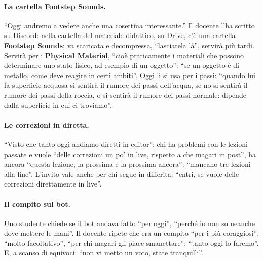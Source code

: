 \paragraph{La cartella Footstep Sounds.} ``Oggi andremo a vedere anche una cosettina
interessante.'' Il docente l'ha scritto su Discord: nella cartella del materiale
didattico, su Drive, c'è una cartella \textbf{Footstep Sounds}; va scaricata e
decompressa, ``lasciatela là'', servirà più tardi. Servirà per i \textbf{Physical
Material}, ``cioè praticamente i materiali che possono determinare uno stato fisico, ad
esempio di un oggetto'': ``se un oggetto è di metallo, come deve reagire in certi
ambiti''. Oggi li si usa per i passi: ``quando lui fa superficie acquosa si sentirà il
rumore dei passi dell'acqua, se no si sentirà il rumore dei passi della roccia, o si
sentirà il rumore dei passi normale: dipende dalla superficie in cui ci troviamo''.

\paragraph{Le correzioni in diretta.} ``Visto che tanto oggi andiamo diretti in
editor'': chi ha problemi con le lezioni passate e vuole ``delle correzioni un po' in
live, rispetto a che magari in post'', ha ancora ``questa lezione, la prossima e la
prossima ancora'': ``mancano tre lezioni alla fine''. L'invito vale anche per chi segue in
differita: ``entri, se vuole delle correzioni direttamente in live''.

\paragraph{Il compito sul bot.} Uno studente chiede se il bot andava fatto ``per oggi'',
``perché io non so neanche dove mettere le mani''. Il docente ripete che era un compito
``per i più coraggiosi'', ``molto facoltativo'', ``per chi magari gli piace smanettare'':
``tanto oggi lo faremo''. E, a scanso di equivoci: ``non vi metto un voto, state
tranquilli''.

